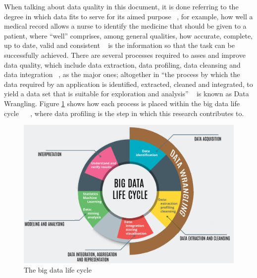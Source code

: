 When talking about data quality in this document, it is done referring to the degree in
which data fits to serve for its aimed purpose ~\cite{MargaretRouse}, for example, how well a medical
record allows a nurse to identify the medicine that should be given to a patient, where
“well” comprises, among general qualities, how accurate, complete, up to date, valid
and consistent ~\cite{DAMA2013} is the information so that the task can be successfully achieved.
There are several processes required to asses and improve data quality, which include data extraction, data profiling, data cleansing and data integration ~\cite{JagadishGehrkeLabrindisPapakonstantinou}, as the
major ones; altogether in “the process by which the data required by an application is
identified, extracted, cleaned and integrated, to yield a data set that is suitable for exploration and analysis” ~\cite{NormanPaton} is known as Data Wrangling. 
Figure \ref{fig:img_big_data_life_cycle} shows how each process is placed within the big data life 
cycle ~\cite{ComputingResearchAssociation} 
~\cite{JagadishGehrkeLabrindisPapakonstantinou}, where data profiling is the step in which this research contributes to.

\begin{figure}[H]
    \centering
    \includegraphics[scale=.3]{big_data_life_cycle}
    \caption{The big data life cycle}
    \label{fig:img_big_data_life_cycle}
\end{figure}


